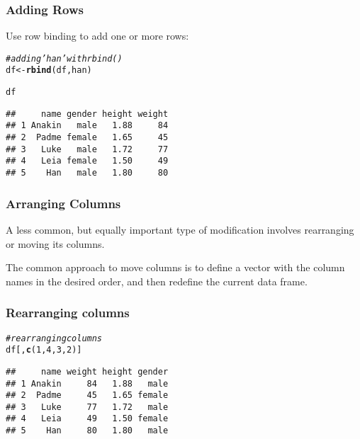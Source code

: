 \documentclass[12pt]{beamer}\usepackage[]{graphicx}\usepackage[]{color}
\makeatletter
\newcommand{\hlnum}[1]{\textcolor[rgb]{0.686,0.059,0.569}{#1}}%
\newcommand{\hlcom}[1]{\textcolor[rgb]{0.678,0.584,0.686}{\textit{#1}}}%
\newcommand{\hlstd}[1]{\textcolor[rgb]{0.345,0.345,0.345}{#1}}%
\newcommand{\hlkwb}[1]{\textcolor[rgb]{0.69,0.353,0.396}{#1}}%
\newcommand{\hlkwd}[1]{\textcolor[rgb]{0.737,0.353,0.396}{\textbf{#1}}}%
\newenvironment{kframe}{%
 \def\at@end@of@kframe{}%
 \ifinner\ifhmode%
  \def\at@end@of@kframe{\end{minipage}}%
  \begin{minipage}{\columnwidth}%
 \fi\fi%
 \def\FrameCommand##1{\hskip\@totalleftmargin \hskip-\fboxsep
 \colorbox{shadecolor}{##1}\hskip-\fboxsep
     \hskip-\linewidth \hskip-\@totalleftmargin \hskip\columnwidth}%
 \MakeFramed {\advance\hsize-\width
   \@totalleftmargin\z@ \linewidth\hsize
   \@setminipage}}%
 {\par\unskip\endMakeFramed%
 \at@end@of@kframe}
\newenvironment{knitrout}{}{} %
\makeatother
\begin{document}

\begin{frame}[fragile]
\frametitle{Adding Rows}

Use row binding  to add one or more rows:
\begin{knitrout}\footnotesize
{}\color{fgcolor}\begin{kframe}
\begin{alltt}
\hlcom{# adding 'han' with rbind()}
\hlstd{df} \hlkwb{<-} \hlkwd{rbind}\hlstd{(df, han)}

\hlstd{df}
\end{alltt}
\begin{verbatim}
##     name gender height weight
## 1 Anakin   male   1.88     84
## 2  Padme female   1.65     45
## 3   Luke   male   1.72     77
## 4   Leia female   1.50     49
## 5    Han   male   1.80     80
\end{verbatim}
\end{kframe}
\end{knitrout}

\end{frame}


\begin{frame}
\frametitle{Arranging Columns}
A less common, but equally important type of  modification involves rearranging or moving its columns.

\bigskip

The common approach to move columns is to define a vector with the column names in the desired order, and then redefine the current data frame.
\end{frame}


\begin{frame}[fragile]
\frametitle{Rearranging columns}

\begin{knitrout}\footnotesize
{}\color{fgcolor}\begin{kframe}
\begin{alltt}
\hlcom{# rearranging columns}
\hlstd{df[ ,} \hlkwd{c}\hlstd{(}\hlnum{1}\hlstd{,} \hlnum{4}\hlstd{,} \hlnum{3}\hlstd{,} \hlnum{2}\hlstd{)]}
\end{alltt}
\begin{verbatim}
##     name weight height gender
## 1 Anakin     84   1.88   male
## 2  Padme     45   1.65 female
## 3   Luke     77   1.72   male
## 4   Leia     49   1.50 female
## 5    Han     80   1.80   male
\end{verbatim}
\end{kframe}
\end{knitrout}

\end{frame}
\end{document}
